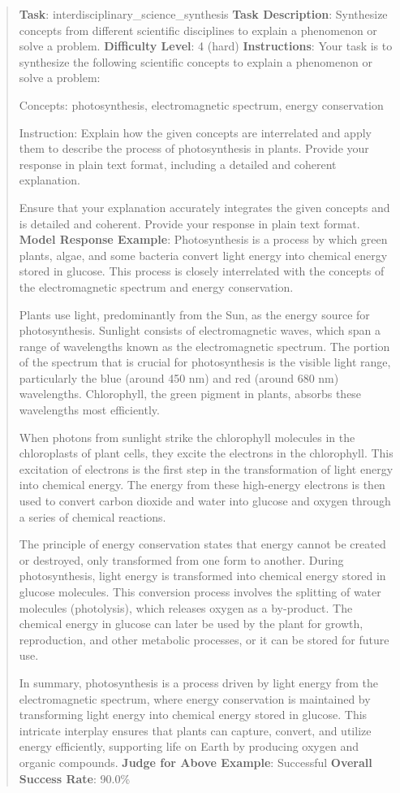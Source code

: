 \documentclass[fleqn,10pt]{wlscirep}
\begin{document}
\begin{quote}
\textbf{Task}: interdisciplinary\_science\_synthesis \textbf{Task
Description}: Synthesize concepts from different scientific disciplines
to explain a phenomenon or solve a problem. \textbf{Difficulty Level}: 4
(hard) \textbf{Instructions}: Your task is to synthesize the following
scientific concepts to explain a phenomenon or solve a problem:

Concepts: photosynthesis, electromagnetic spectrum, energy conservation

Instruction: Explain how the given concepts are interrelated and apply
them to describe the process of photosynthesis in plants. Provide your
response in plain text format, including a detailed and coherent
explanation.

Ensure that your explanation accurately integrates the given concepts
and is detailed and coherent. Provide your response in plain text
format. \textbf{Model Response Example}: Photosynthesis is a process by
which green plants, algae, and some bacteria convert light energy into
chemical energy stored in glucose. This process is closely interrelated
with the concepts of the electromagnetic spectrum and energy
conservation.

Plants use light, predominantly from the Sun, as the energy source for
photosynthesis. Sunlight consists of electromagnetic waves, which span a
range of wavelengths known as the electromagnetic spectrum. The portion
of the spectrum that is crucial for photosynthesis is the visible light
range, particularly the blue (around 450 nm) and red (around 680 nm)
wavelengths. Chlorophyll, the green pigment in plants, absorbs these
wavelengths most efficiently.

When photons from sunlight strike the chlorophyll molecules in the
chloroplasts of plant cells, they excite the electrons in the
chlorophyll. This excitation of electrons is the first step in the
transformation of light energy into chemical energy. The energy from
these high-energy electrons is then used to convert carbon dioxide and
water into glucose and oxygen through a series of chemical reactions.

The principle of energy conservation states that energy cannot be
created or destroyed, only transformed from one form to another. During
photosynthesis, light energy is transformed into chemical energy stored
in glucose molecules. This conversion process involves the splitting of
water molecules (photolysis), which releases oxygen as a by-product. The
chemical energy in glucose can later be used by the plant for growth,
reproduction, and other metabolic processes, or it can be stored for
future use.

In summary, photosynthesis is a process driven by light energy from the
electromagnetic spectrum, where energy conservation is maintained by
transforming light energy into chemical energy stored in glucose. This
intricate interplay ensures that plants can capture, convert, and
utilize energy efficiently, supporting life on Earth by producing oxygen
and organic compounds. \textbf{Judge for Above Example}: Successful
\textbf{Overall Success Rate}: 90.0\%
\end{quote}
\end{document}
